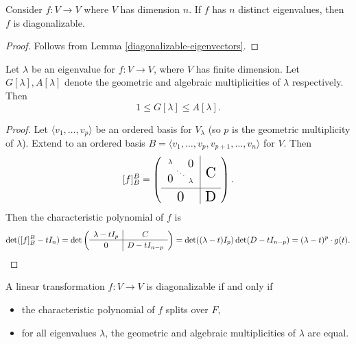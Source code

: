 \begin{cor}
    Consider $f: V \to V$ where $V$ has dimension $n$. If $f$ has $n$ distinct eigenvalues, then $f$ is diagonalizable.
\end{cor}

\begin{proof}
    Follows from Lemma \ref{diagonalizable-eigenvectors}.
\end{proof}

\begin{thm}\label{eigenvalue-multiplicity-inequality}
    Let $\lambda$ be an eigenvalue for $f: V \to V$, where $V$ has finite dimension. Let $G[\lambda], A[\lambda]$ denote the geometric and algebraic multiplicities of $\lambda$ respectively. Then
    \[1 \leq G[\lambda] \leq A[\lambda].\]
\end{thm}

\begin{proof}
    Let $\langle v_1, \ldots, v_p\rangle$ be an ordered basis for $V_{\lambda}$ (so $p$ is the geometric multiplicity of $\lambda$). Extend to an ordered basis $B = \langle v_1, \ldots, v_p, v_{p+1}, \ldots, v_n\rangle$ for $V$. Then
    \[[f]_B^B = \left(\begin{array}{c|c}
        \raisebox{-10pt}[0pt][25pt]{$\begin{smallmatrix}
            \lambda & & \smallblock{1.2}{-0.8}{0}\\
            & \ddots & \\
            \smallblock{1.2}{-0.3}{0} & & \lambda
        \end{smallmatrix}$} & \raisebox{-14pt}[0pt]{\scalebox{1.5}{C}} \\
        \hline
        \raisebox{-5pt}[0pt][8pt]{\scalebox{1.5}{0}} & \raisebox{-5pt}[0pt][8pt]{\scalebox{1.5}{D}}
    \end{array}\right).\]
    Then the characteristic polynomial of $f$ is
    \[\det([f]_B^B - tI_n) = \det\left(\begin{array}{c|c}
        \lambda - tI_p & C \\
        \hline
        \raisebox{-1pt}[0pt][5pt]{0} & \raisebox{-1pt}[0pt][5pt]{$D - tI_{n-p}$}
    \end{array}\right) = \det((\lambda - t)I_p)\det(D - tI_{n-p}) = (\lambda - t)^{p} \cdot g(t).\]
\end{proof}

\begin{thm}
    A linear transformation $f: V \to V$ is diagonalizable if and only if
    \begin{itemize}
        \item the characteristic polynomial of $f$ splits over $F$,
        \item for all eigenvalues $\lambda$, the geometric and algebraic multiplicities of $\lambda$ are equal.
    \end{itemize}
\end{thm}

